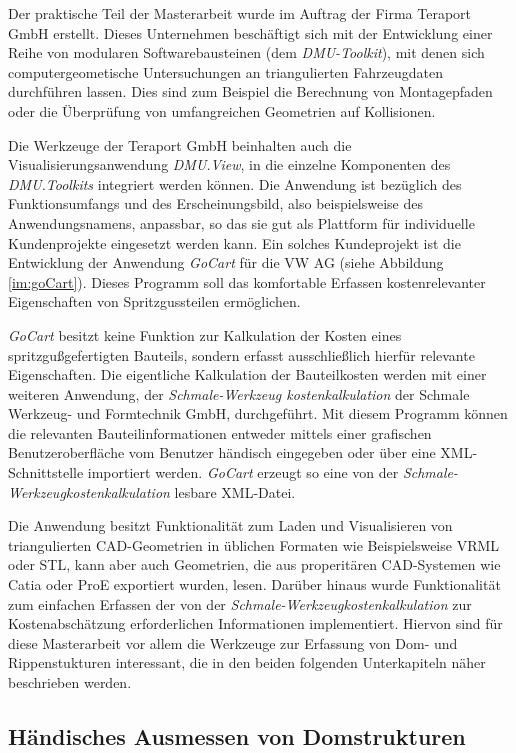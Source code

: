 Der praktische Teil der Masterarbeit wurde im Auftrag der Firma Teraport GmbH erstellt. Dieses Unternehmen besch\"aftigt sich mit der Entwicklung einer Reihe von modularen Softwarebausteinen (dem \textit{DMU-Toolkit}), mit denen sich computergeometische Untersuchungen an triangulierten Fahrzeugdaten durchf\"uhren lassen. Dies sind zum Beispiel die Berechnung von Montagepfaden oder die \"Uberpr\"ufung von umfangreichen Geometrien auf Kollisionen. 

Die Werkzeuge der Teraport GmbH beinhalten auch die Visualisierungsanwendung \textit{DMU.View}, in die einzelne Komponenten des \textit{DMU.Toolkits} integriert werden k\"onnen. Die Anwendung ist bez\"uglich des Funktionsumfangs und des Erscheinungsbild, also beispielsweise des Anwendungsnamens, anpassbar, so das sie gut als Plattform f\"ur individuelle Kundenprojekte eingesetzt werden kann. Ein solches Kundeprojekt ist die Entwicklung der Anwendung \textit{GoCart} f\"ur die VW AG (siehe Abbildung \ref{im:goCart}). Dieses Programm soll das komfortable Erfassen kostenrelevanter Eigenschaften von Spritzgussteilen erm\"oglichen.  

\textit{GoCart} besitzt keine Funktion zur Kalkulation der Kosten eines spritzgu{\ss}gefertigten Bauteils, sondern erfasst ausschlie{\ss}lich hierf\"ur relevante Eigenschaften. Die eigentliche Kalkulation der Bauteilkosten werden mit einer weiteren Anwendung, der \textit{Schmale-Werkzeug kostenkalkulation} der Schmale Werkzeug- und Formtechnik GmbH, durchgef\"uhrt. Mit diesem Programm k\"onnen die relevanten Bauteilinformationen entweder mittels einer grafischen Benutzeroberfl\"ache vom Benutzer h\"andisch eingegeben oder über eine XML-Schnittstelle importiert werden. \textit{GoCart} erzeugt so eine von der \textit{Schmale-Werkzeugkostenkalkulation} lesbare XML-Datei.

Die Anwendung besitzt Funktionalität zum Laden und Visualisieren von triangulierten CAD-Geometrien in üblichen Formaten wie Beispielsweise VRML oder STL, kann aber auch Geometrien, die aus properit\"aren CAD-Systemen wie Catia oder ProE exportiert wurden, lesen. Dar\"uber hinaus wurde Funktionalit\"at zum einfachen Erfassen der von der \textit{Schmale-Werkzeugkostenkalkulation} zur Kostenabsch\"atzung erforderlichen Informationen implementiert. Hiervon sind f\"ur diese Masterarbeit vor allem die Werkzeuge zur Erfassung von Dom- und Rippenstukturen interessant, die in den beiden folgenden Unterkapiteln n\"aher beschrieben werden.


\subsection{H\"andisches Ausmessen von Domstrukturen}
\label{domeMeasure}

